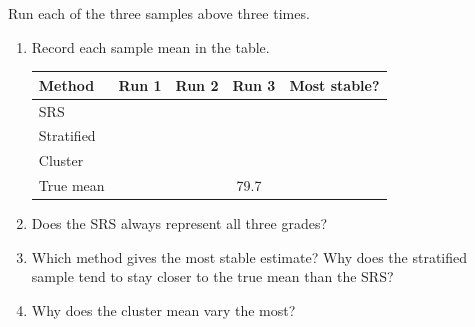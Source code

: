 \begin{Exercise}[title={Comparing Sampling Methods}, label={ex:sampling-compare}]
Run each of the three samples above three times.
\begin{enumerate}
    \item Record each sample mean in the table.

\medskip
\begin{tabular}{|p{}|p{}|p{}|p{}|p{}|}
\hline
Method & Run 1 & Run 2 & Run 3 & Most stable? \\
\hline
SRS & & & & \\[1.5em]
\hline
Stratified & & & & \\[1.5em]
\hline
Cluster & & & & \\[1.5em]
\hline
True mean & \multicolumn{4}{c|}{79.7} \\
\hline
\end{tabular}
\medskip

    \item Does the SRS always represent all three grades?
    \item Which method gives the most stable estimate? Why does the stratified sample tend to stay closer to the true mean than the SRS?
    \item Why does the cluster mean vary the most?
\end{enumerate}




\end{Exercise}
